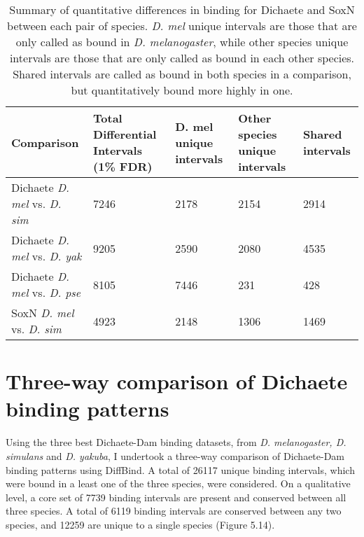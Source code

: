 \begin{table}[h]
\centering
\begin{tabular}{|p{3cm}|p{2.5cm}|p{2.5cm}|p{2.5cm}|p{2.5cm}|}
\hline
\textbf{Comparison}                 & \textbf{Total Differential Intervals (1\% FDR)} & \textbf{D. mel unique intervals} & \textbf{Other species unique intervals} & \textbf{Shared intervals} \\ \hline
Dichaete \emph{D. mel} vs. \emph{D. sim} & 7246                                   & 2178                    & 2154                           & 2914             \\ \hline
Dichaete \emph{D. mel} vs. \emph{D. yak} & 9205                                   & 2590                    & 2080                           & 4535             \\ \hline
Dichaete \emph{D. mel} vs. \emph{D. pse} & 8105                                   & 7446                    & 231                            & 428              \\ \hline
SoxN \emph{D. mel} vs. \emph{D. sim}     & 4923                                   & 2148                    & 1306                           & 1469             \\ \hline
\end{tabular}
\caption{Summary of quantitative differences in binding for Dichaete and SoxN between each pair of species. \emph{D. mel} unique intervals are those that are only called as bound in \emph{D. melanogaster}, while other species unique intervals are those that are only called as bound in each other species. Shared intervals are called as bound in both species in a comparison, but quantitatively bound more highly in one.}
\label{Table 5.1}
\end{table}

\section{Three-way comparison of Dichaete binding patterns}
Using the three best Dichaete-Dam binding datasets, from \emph{D. melanogaster, D. simulans} and \emph{D. yakuba}, I undertook a three-way comparison of Dichaete-Dam binding patterns using DiffBind. A total of 26117 unique binding intervals, which were bound in a least one of the three species, were considered. On a qualitative level, a core set of 7739 binding intervals are present and conserved between all three species. A total of 6119 binding intervals are conserved between any two species, and 12259 are unique to a single species (Figure 5.14).\\

